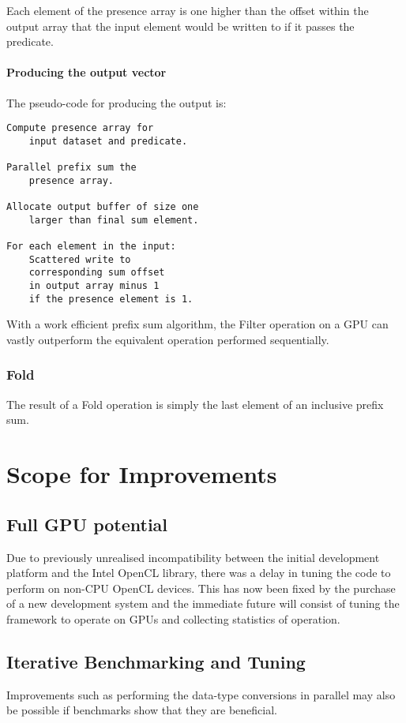 Each element of the presence array is one higher than the offset within the output array that the input element would be written to if it passes the predicate.

    \paragraph{Producing the output vector}
    The pseudo-code for producing the output is:
    \begin{verbatim}
Compute presence array for
    input dataset and predicate.

Parallel prefix sum the
    presence array.

Allocate output buffer of size one
    larger than final sum element.

For each element in the input:
    Scattered write to
    corresponding sum offset
    in output array minus 1
    if the presence element is 1.
    \end{verbatim}

  With a work efficient prefix sum algorithm, the Filter operation on a GPU can vastly outperform the equivalent operation performed sequentially.\cite{gpusum}

  \subsubsection{Fold}
    The result of a Fold operation is simply the last element of an inclusive prefix sum.

\section{Scope for Improvements}
    \subsection{Full GPU potential}
    Due to previously unrealised incompatibility between the initial development platform and the Intel OpenCL library, there was a delay in tuning the code to perform on non-CPU OpenCL devices. This has now been fixed by the purchase of a new development system and the immediate future will consist of tuning the framework to operate on GPUs and collecting statistics of operation.
    \subsection{Iterative Benchmarking and Tuning}
    Improvements such as performing the data-type conversions in parallel may also be possible if benchmarks show that they are beneficial.

